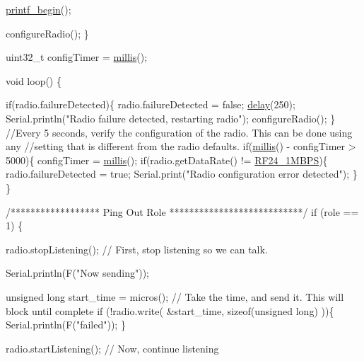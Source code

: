 \begin{DoxyCodeInclude}
  \hyperlink{printf_8h_afc0d9ca32710dff550ebe56ab6b39d23}{printf\_begin}();
  
  configureRadio();  
\}

uint32\_t configTimer =  \hyperlink{group__Porting__General_gad5b3ec1ce839fa1c4337a7d0312e9749}{millis}();

\textcolor{keywordtype}{void} loop() \{
  
  \textcolor{keywordflow}{if}(radio.failureDetected)\{
    radio.failureDetected = \textcolor{keyword}{false};
    \hyperlink{group__Porting__General_ga70a331e8ddf9acf9d33c47b71cda4c5f}{delay}(250);
    Serial.println(\textcolor{stringliteral}{"Radio failure detected, restarting radio"});
    configureRadio();        
  \}
  \textcolor{comment}{//Every 5 seconds, verify the configuration of the radio. This can be done using any }
  \textcolor{comment}{//setting that is different from the radio defaults.}
  \textcolor{keywordflow}{if}(\hyperlink{group__Porting__General_gad5b3ec1ce839fa1c4337a7d0312e9749}{millis}() - configTimer > 5000)\{
    configTimer = \hyperlink{group__Porting__General_gad5b3ec1ce839fa1c4337a7d0312e9749}{millis}();
    \textcolor{keywordflow}{if}(radio.getDataRate() != \hyperlink{RF24_8h_a82745de4aa1251b7561564b3ed1d6522afd01f3fd55247a67c0bcfd459fe17fdf}{RF24\_1MBPS})\{
      radio.failureDetected = \textcolor{keyword}{true};
      Serial.print(\textcolor{stringliteral}{"Radio configuration error detected"});
    \}
  \}
  
\textcolor{comment}{/****************** Ping Out Role ***************************/}  
\textcolor{keywordflow}{if} (role == 1)  \{
    
    radio.stopListening();                                    \textcolor{comment}{// First, stop listening so we can talk.}
    
    
    Serial.println(F(\textcolor{stringliteral}{"Now sending"}));

    \textcolor{keywordtype}{unsigned} \textcolor{keywordtype}{long} start\_time = micros();                             \textcolor{comment}{// Take the time, and send it.  This
       will block until complete}
     \textcolor{keywordflow}{if} (!radio.write( &start\_time, \textcolor{keyword}{sizeof}(\textcolor{keywordtype}{unsigned} \textcolor{keywordtype}{long}) ))\{
       Serial.println(F(\textcolor{stringliteral}{"failed"}));
     \}
        
    radio.startListening();                                    \textcolor{comment}{// Now, continue listening}
    

\end{DoxyCodeInclude}
